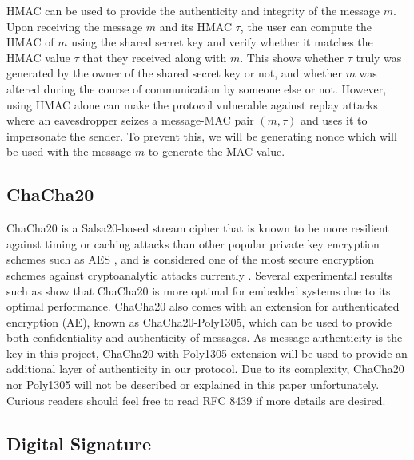 HMAC can be used to provide the authenticity and integrity of the message $m$. Upon receiving the message $m$ and its HMAC $\tau$, the user can compute the HMAC of $m$ using the shared secret key and verify whether it matches the HMAC value $\tau$ that they received along with $m$. This shows whether $\tau$ truly was generated by the owner of the shared secret key or not, and whether $m$ was altered during the course of communication by someone else or not. However, using HMAC alone can make the protocol vulnerable against replay attacks where an eavesdropper seizes a message-MAC pair $(m, \tau)$ and uses it to impersonate the sender. To prevent this, we will be generating nonce which will be used with the message $m$ to generate the MAC value. 

\subsection{ChaCha20}

ChaCha20 is a Salsa20-based stream cipher that is known to be more resilient against timing or caching attacks than other popular private key encryption schemes such as AES \cite{Najm2018ChaCha20}, and is considered one of the most secure encryption schemes against cryptoanalytic attacks currently \cite{Mouha2013Salsa20}. Several experimental results such as \cite{DeStatis2017ChaCha20} show that ChaCha20 is more optimal for embedded systems due to its optimal performance. ChaCha20 also comes with an extension for authenticated encryption (AE), known as ChaCha20-Poly1305, which can be used to provide both confidentiality and authenticity of messages. As message authenticity is the key in this project, ChaCha20 with Poly1305 extension will be used to provide an additional layer of authenticity in our protocol. Due to its complexity, ChaCha20 nor Poly1305 will not be described or explained in this paper unfortunately. Curious readers should feel free to read RFC 8439 \cite{rfc8439} if more details are desired.  

\subsection{Digital Signature}





